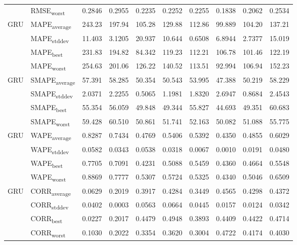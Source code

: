 {\begin{longtable}{l l c c c c c c c c}
 & RMSE\textsubscript{worst} & 0.2846 & 0.2955 & 0.2235 & 0.2252 & 0.2255 & 0.1838 & 0.2062 & 0.2534 \\
\cmidrule(lr){2-10}
\multirow{4}{*}{GRU} & MAPE\textsubscript{average} & 243.23 & 197.94 & 105.28 & 129.88 & 112.86 & 99.889 & 104.20 & 137.21 \\
 & MAPE\textsubscript{stddev} & 11.403 & 3.1205 & 20.937 & 10.644 & 0.6508 & 6.8944 & 2.7377 & 15.019 \\
 & MAPE\textsubscript{best} & 231.83 & 194.82 & 84.342 & 119.23 & 112.21 & 106.78 & 101.46 & 122.19 \\
 & MAPE\textsubscript{worst} & 254.63 & 201.06 & 126.22 & 140.52 & 113.51 & 92.994 & 106.94 & 152.23 \\
\cmidrule(lr){2-10}
\multirow{4}{*}{GRU} & SMAPE\textsubscript{average} & 57.391 & 58.285 & 50.354 & 50.543 & 53.995 & 47.388 & 50.219 & 58.229 \\
 & SMAPE\textsubscript{stddev} & 2.0371 & 2.2255 & 0.5065 & 1.1981 & 1.8320 & 2.6947 & 0.8684 & 2.4543 \\
 & SMAPE\textsubscript{best} & 55.354 & 56.059 & 49.848 & 49.344 & 55.827 & 44.693 & 49.351 & 60.683 \\
 & SMAPE\textsubscript{worst} & 59.428 & 60.510 & 50.861 & 51.741 & 52.163 & 50.082 & 51.088 & 55.775 \\
\cmidrule(lr){2-10}
\multirow{4}{*}{GRU} & WAPE\textsubscript{average} & 0.8287 & 0.7434 & 0.4769 & 0.5406 & 0.5392 & 0.4350 & 0.4855 & 0.6029 \\
 & WAPE\textsubscript{stddev} & 0.0582 & 0.0343 & 0.0538 & 0.0318 & 0.0067 & 0.0010 & 0.0191 & 0.0480 \\
 & WAPE\textsubscript{best} & 0.7705 & 0.7091 & 0.4231 & 0.5088 & 0.5459 & 0.4360 & 0.4664 & 0.5548 \\
 & WAPE\textsubscript{worst} & 0.8869 & 0.7777 & 0.5307 & 0.5724 & 0.5325 & 0.4340 & 0.5046 & 0.6509 \\
\cmidrule(lr){2-10}
\multirow{4}{*}{GRU} & CORR\textsubscript{average} & 0.0629 & 0.2019 & 0.3917 & 0.4284 & 0.3449 & 0.4565 & 0.4298 & 0.4372 \\
 & CORR\textsubscript{stddev} & 0.0402 & 0.0003 & 0.0563 & 0.0664 & 0.0445 & 0.0157 & 0.0124 & 0.0342 \\
 & CORR\textsubscript{best} & 0.0227 & 0.2017 & 0.4479 & 0.4948 & 0.3893 & 0.4409 & 0.4422 & 0.4714 \\
 & CORR\textsubscript{worst} & 0.1030 & 0.2022 & 0.3354 & 0.3620 & 0.3004 & 0.4722 & 0.4174 & 0.4030 \\

\end{longtable}}
